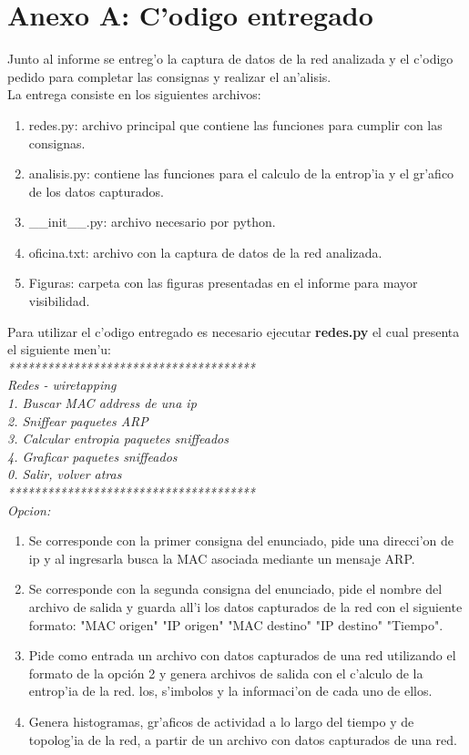 \documentclass[a4paper,10pt]{article}
\begin{document}
\section{Anexo A: C'odigo entregado}

Junto al informe se entreg'o la captura de datos de la red analizada y el c'odigo pedido para completar las consignas y realizar el an'alisis. \\
La entrega consiste en los siguientes archivos:
\noindent \begin{enumerate}
\item	redes.py: archivo principal que contiene las funciones para cumplir con las consignas.
\item	analisis.py: contiene las funciones para el calculo de la entrop'ia y el gr'afico de los datos capturados.
\item	\_\_init\_\_.py: archivo necesario por python.
\item	oficina.txt: archivo con la captura de datos de la red analizada.
\item	Figuras: carpeta con las figuras presentadas en el informe para mayor visibilidad. 
\end{enumerate}
Para utilizar el c'odigo entregado es necesario ejecutar \textbf{redes.py} el cual presenta el siguiente men'u:\\
\textit{
**************************************	\\
Redes - wiretapping	\\
1. Buscar MAC address de una ip	\\
2. Sniffear paquetes ARP	\\
3. Calcular entropia paquetes sniffeados	\\
4. Graficar paquetes sniffeados	\\
0. Salir, volver atras	\\
**************************************	\\
Opcion: 	\\
}
\noindent \begin{enumerate}
\item	Se corresponde con la primer consigna del enunciado, pide una direcci'on de ip y al ingresarla busca la MAC asociada mediante un mensaje ARP.
\item	Se corresponde con la segunda consigna del enunciado, pide el nombre del archivo de salida y guarda all'i los datos capturados de la red con el siguiente formato: "MAC origen" "IP origen" "MAC destino" "IP destino" "Tiempo". 
\item	Pide como entrada un archivo con datos capturados de una red utilizando el formato de la opción 2 y genera archivos de salida con el c'alculo de la entrop'ia de la red. los, s'imbolos y la informaci'on de cada uno de ellos.
\item	Genera histogramas, gr'aficos de actividad a lo largo del tiempo y de topolog'ia de la red, a partir de un archivo con datos capturados de una red.
\end{enumerate}
\end{document}
